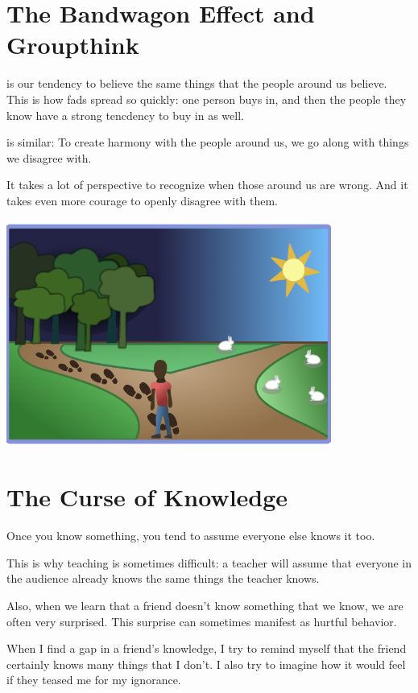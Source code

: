\section{The Bandwagon Effect and Groupthink}

 is our tendency to believe the same
things that the people around us believe. This is how fads spread so
quickly: one person buys in, and then the people they know have a
strong tencdency to buy in as well.

 is similar: To create harmony with the
people around us, we go along with things we disagree with.

It takes a lot of perspective to recognize when those around us are
wrong. And it takes even more courage to openly disagree with them.

\includegraphics[width=0.8\textwidth]{bias_bandwagon.png}

\section{The Curse of Knowledge}

Once you know something, you tend to assume everyone else knows it too.

This is why teaching is sometimes difficult: a teacher will assume
that everyone in the audience already knows the same things the
teacher knows.

Also, when we learn that a friend doesn't know something that we know,
we are often very surprised. This surprise can sometimes manifest as
hurtful behavior.

When I find a gap in a friend's knowledge, I try to remind myself that
the friend certainly knows many things that I don't. I also try to
imagine how it would feel if they teased me for my ignorance.

